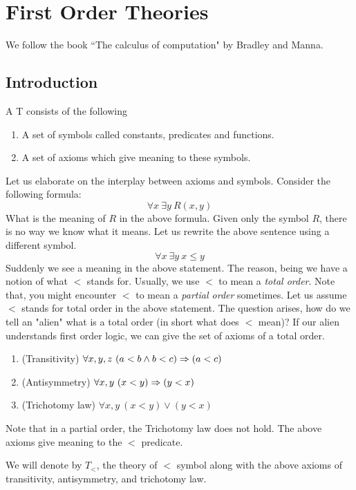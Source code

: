\chapter{First Order Theories}
We follow the book ``The calculus of computation" by Bradley and Manna.

\section{Introduction}
A  T consists of the following
\begin{enumerate}
\item A set of symbols called constants, predicates and functions.
\item A set of axioms which give meaning to these symbols.
\end{enumerate}

Let us elaborate on the interplay between axioms and symbols. Consider the following formula:
\[
\forall x ~\exists y ~R(x,y)
\]
What is the meaning of $R$ in the above formula. Given only the symbol $R$, there is no way we know what it means. Let us rewrite the above sentence using a different symbol.
\[
\forall x ~\exists y ~x\leq y
\]
Suddenly we see a meaning in the above statement. The reason, being we have a notion of what $<$ stands for. Usually, we use $<$  to mean a \emph{total order}. Note that, you might encounter $<$ to mean a \emph{partial order} sometimes. Let us assume $<$ stands for total order in the above statement. The question arises, how do we tell an "alien" what is a total order (in short what does $<$ mean)? If our alien understands first order logic, we can give the set of axioms of a total order.
\begin{enumerate}
\item (Transitivity) $\forall x,y,z ~(a < b \wedge b < c) \Rightarrow (a < c)$
\item (Antisymmetry) $\forall x, y ~(x < y) \Rightarrow (y < x)$
\item (Trichotomy law) $\forall x,y ~(x < y) \vee (y < x)$
\end{enumerate}
Note that in a partial order, the Trichotomy law does not hold. The above axioms give meaning to the $<$ predicate. 
\begin{example}
We will denote by $T_<$, the theory of $<$ symbol along with the above axioms of transitivity, antisymmetry, and trichotomy law.
\end{example}

